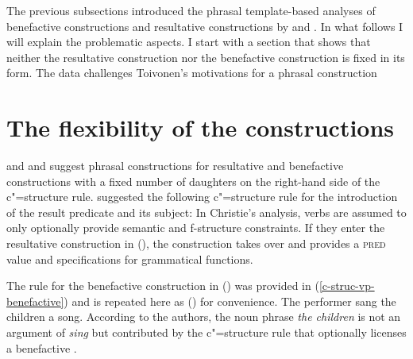 The previous subsections introduced the phrasal template-based analyses of benefactive constructions
and resultative constructions by \citet{AGT2014a} and \citet{Christie2010a}. In what follows I will
explain the problematic aspects. I start with a section that shows that neither the resultative
construction nor the benefactive construction is fixed in its form. The data challenges Toivonen's
motivations for a phrasal construction \citep{Toivonen2013a}

\chapter{The flexibility of the constructions}
\label{sec-flexibility}

\citet{Christie2010a} and \citet{Toivonen2013a} and \citet{AGT2014a} suggest phrasal constructions
for resultative and benefactive constructions with a fixed number of daughters on the right-hand
side of the c"=structure rule. \citet{Christie2010a} suggested the following c"=structure rule for the introduction of the result
predicate and its subject:
\ea
\label{c-structure-resultative-christie}
\z
In Christie's analysis, verbs are assumed to only optionally provide semantic and f-structure
constraints. If they enter the resultative construction in (), the construction takes over
and provides a \textsc{pred} value and specifications for grammatical functions.

The rule for the benefactive construction in () was provided in
(\ref{c-struc-vp-benefactive}) and is repeated here as () for convenience.
\ea
The performer sang the children a song.
\z
\ea\label{c-struc-vp-benefactive-two}
\z
According to the authors, the noun phrase \emph{the children} is not an argument of \emph{sing} but
contributed by the c"=structure rule that optionally licenses a benefactive \citep[]{AGT2014a}.

